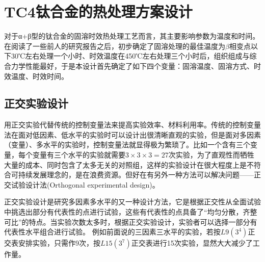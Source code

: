 
\section{TC4钛合金的热处理方案设计}
对于α+β型的\ti 钛合金的固溶时效热处理工艺而言，其主要影响参数为温度和时间。在阅读了一些前人的研究报告\cite{mirror1}\cite{mirror2}之后，初步确定了固溶处理的最佳温度为$ \beta $相变点以下30℃左右处理一个小时、时效温度在450℃左右处理三个小时后，组织组成与综合力学性能最好，于是本设计首先确定了如下四个变量：固溶温度、固溶方式、时效温度、时效时间。
\subsection{正交实验设计}
用正交实验代替传统的控制变量法来提高实验效率、材料利用率。传统的控制变量法在面对低因素、低水平的实验时可以设计出很清晰直观的实验，但是面对多因素（变量）、多水平的实验时，控制变量法就显得极为繁琐了。比如一个含有三个变量，每个变量有三个水平的实验就需要$ 3\times 3 \times 3=27$次实验，为了直观性而牺牲大量的成本、同时包含了太多无关的对照组，这样的实验设计在很大程度上是不符合可持续发展理念的，是在浪费资源。但好在有另外一种方法可以解决问题——正交试验设计法(Orthogonal experimental design)。

正交实验设计是研究多因素多水平的又一种设计方法，它是根据正交性从全面试验中挑选出部分有代表性的点进行试验，这些有代表性的点具备了“均匀分散，齐整可比”的特点\cite{wangxueshen}。当实验次数太多时，根据正交实验设计，实验者可以选择一部分有代表性水平组合进行试验。 例如前面说的三因素三水平的实验，若按$ L9(3^4) $正交表安排实验，只需作9次，按$ L15(3^7) $正交表进行15次实验，显然大大减少了工作量。

